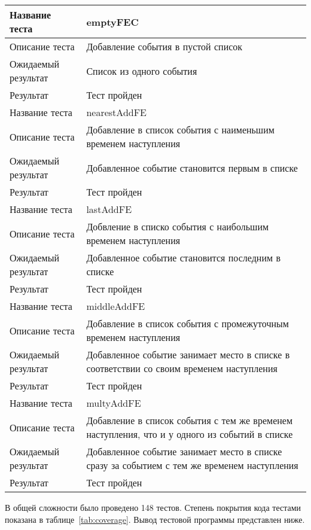 \begin{table}[h!]
\caption{}
\label{tab:chainsTest}
\begin{tabular}{|l|p{}|}
\hline
Название теста & emptyFEC\\
\hline
Описание теста & Добавление события в пустой список\\
\hline
Ожидаемый результат & Список из одного события\\
\hline
Результат & Тест пройден\\
\hline
\hline
Название теста & nearestAddFE\\
\hline
Описание теста & Добавление в список события с наименьшим временем наступления\\
\hline
Ожидаемый результат & Добавленное событие становится первым в списке\\
\hline
Результат & Тест пройден\\
\hline
\hline
Название теста & lastAddFE\\
\hline
Описание теста & Добвление в списко события с наибольшим временем наступления\\
\hline
Ожидаемый результат & Добавленное событие становится последним в списке\\
\hline
Результат & Тест пройден\\
\hline
\hline
Название теста & middleAddFE\\
\hline
Описание теста & Добавление в список события с промежуточным временем наступления\\
\hline
Ожидаемый результат & Добавленное событие занимает место в списке в соответствии со своим временем наступления\\
\hline
Результат & Тест пройден\\
\hline
\hline
Название теста & multyAddFE\\
\hline
Описание теста & Добавление в список события с тем же  временем наступления, что и у  одного из событий в списке\\
\hline
Ожидаемый результат & Добавленное событие занимает место в списке сразу за событием с тем же временем наступления\\
\hline
Результат & Тест пройден \\
\hline
\end{tabular}
\end{table}

В общей сложности было проведено 148 тестов. Степень покрытия кода тестами показана в таблице~\ref{tab:coverage}. Вывод тестовой программы представлен ниже.

